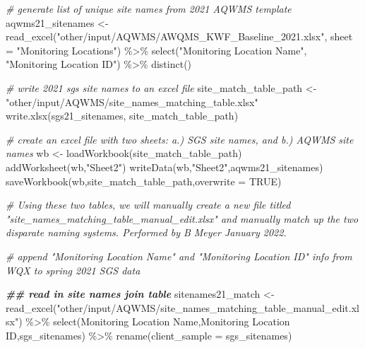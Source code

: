 \documentclass[
]{book}
\newenvironment{Shaded}{\begin{snugshade}}{\end{snugshade}}
\newcommand{\AttributeTok}[1]{\textcolor[rgb]{0.77,0.63,0.00}{#1}}
\newcommand{\CommentTok}[1]{\textcolor[rgb]{0.56,0.35,0.01}{\textit{#1}}}
\newcommand{\ConstantTok}[1]{\textcolor[rgb]{0.00,0.00,0.00}{#1}}
\newcommand{\DocumentationTok}[1]{\textcolor[rgb]{0.56,0.35,0.01}{\textbf{\textit{#1}}}}
\newcommand{\FunctionTok}[1]{\textcolor[rgb]{0.00,0.00,0.00}{#1}}
\newcommand{\NormalTok}[1]{#1}
\newcommand{\OtherTok}[1]{\textcolor[rgb]{0.56,0.35,0.01}{#1}}
\newcommand{\SpecialCharTok}[1]{\textcolor[rgb]{0.00,0.00,0.00}{#1}}
\newcommand{\StringTok}[1]{\textcolor[rgb]{0.31,0.60,0.02}{#1}}
\begin{document}
\begin{Shaded}
\begin{Highlighting}[]
\CommentTok{\# generate list of unique site names from 2021 AQWMS template}
\NormalTok{aqwms21\_sitenames }\OtherTok{\textless{}{-}} \FunctionTok{read\_excel}\NormalTok{(}\StringTok{"other/input/AQWMS/AWQMS\_KWF\_Baseline\_2021.xlsx"}\NormalTok{, }\AttributeTok{sheet =} \StringTok{"Monitoring Locations"}\NormalTok{) }\SpecialCharTok{\%\textgreater{}\%}
  \FunctionTok{select}\NormalTok{(}\StringTok{"Monitoring Location Name"}\NormalTok{, }\StringTok{"Monitoring Location ID"}\NormalTok{) }\SpecialCharTok{\%\textgreater{}\%}
  \FunctionTok{distinct}\NormalTok{()}

\CommentTok{\# write 2021 sgs site names to an excel file}
\NormalTok{site\_match\_table\_path }\OtherTok{\textless{}{-}} \StringTok{"other/input/AQWMS/site\_names\_matching\_table.xlsx"}
\FunctionTok{write.xlsx}\NormalTok{(sgs21\_sitenames, site\_match\_table\_path) }

\CommentTok{\# create an excel file with two sheets: a.) SGS site names, and b.) AQWMS site names}
\NormalTok{wb }\OtherTok{\textless{}{-}} \FunctionTok{loadWorkbook}\NormalTok{(site\_match\_table\_path)}
\FunctionTok{addWorksheet}\NormalTok{(wb,}\StringTok{"Sheet2"}\NormalTok{)}
\FunctionTok{writeData}\NormalTok{(wb,}\StringTok{"Sheet2"}\NormalTok{,aqwms21\_sitenames)}
\FunctionTok{saveWorkbook}\NormalTok{(wb,site\_match\_table\_path,}\AttributeTok{overwrite =} \ConstantTok{TRUE}\NormalTok{)}


\CommentTok{\# Using these two tables, we will manually create a new file titled "site\_names\_matching\_table\_manual\_edit.xlsx" and manually match up the two disparate naming systems. Performed by B Meyer January 2022. }


\CommentTok{\# append "Monitoring Location Name" and "Monitoring Location ID" info from WQX to spring 2021 SGS data}

\DocumentationTok{\#\# read in site names join table}
\NormalTok{sitenames21\_match }\OtherTok{\textless{}{-}} \FunctionTok{read\_excel}\NormalTok{(}\StringTok{"other/input/AQWMS/site\_names\_matching\_table\_manual\_edit.xlsx"}\NormalTok{) }\SpecialCharTok{\%\textgreater{}\%}
  \FunctionTok{select}\NormalTok{(}\StringTok{\textasciigrave{}}\AttributeTok{Monitoring Location Name}\StringTok{\textasciigrave{}}\NormalTok{,}\StringTok{\textasciigrave{}}\AttributeTok{Monitoring Location ID}\StringTok{\textasciigrave{}}\NormalTok{,sgs\_sitenames) }\SpecialCharTok{\%\textgreater{}\%}
  \FunctionTok{rename}\NormalTok{(}\AttributeTok{client\_sample =}\NormalTok{ sgs\_sitenames)}
\end{Highlighting}
\end{Shaded}
\end{document}
